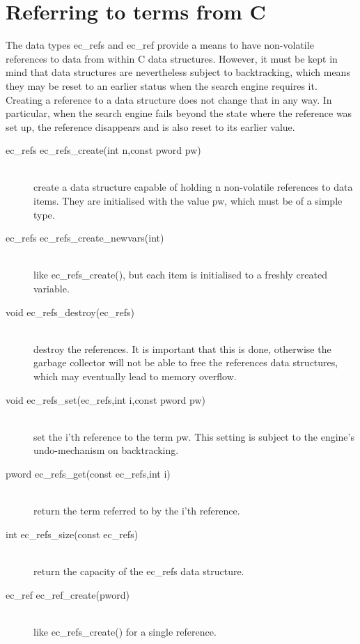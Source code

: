\section{Referring to {\eclipse} terms from C}
The data types ec_refs and ec_ref provide a means to have non-volatile
references to {\eclipse} data from within C data structures. However,
it must be kept in mind that {\eclipse} data structures are nevertheless
subject to backtracking, which means they may be reset to an earlier
status when the search engine requires it. Creating a reference to
a data structure does not change that in any way. In particular, 
when the search engine fails beyond the state where the reference was
set up, the reference disappears and is also reset to its earlier value.
\begin{description}
\item[ec_refs		ec_refs_create(int n,const pword pw)]\ \\
	create a data structure capable of holding n non-volatile
	references to {\eclipse} data items. They are initialised
	with the value pw, which must be of a simple type.

\item[ec_refs		ec_refs_create_newvars(int)]\ \\
	like ec_refs_create(), but each item is initialised to
	a freshly created {\eclipse} variable.

\item[void		ec_refs_destroy(ec_refs)]\ \\
	destroy the {\eclipse} references. It is important that this
	is done, otherwise the {\eclipse} garbage collector will not
	be able to free the references data structures, which may
	eventually lead to memory overflow.

\item[void		ec_refs_set(ec_refs,int i,const pword pw)]\ \\
	set the i'th reference to the {\eclipse} term pw. This setting is
	subject to the {\eclipse} engine's undo-mechanism on backtracking.

\item[pword		ec_refs_get(const ec_refs,int i)]\ \\
	return the {\eclipse} term referred to by the i'th reference.

\item[int		ec_refs_size(const ec_refs)]\ \\
	return the capacity of the ec_refs data structure.

\item[ec_ref		ec_ref_create(pword)]\ \\
	like ec_refs_create() for a single reference.


\end{description}
